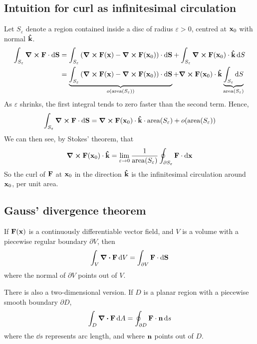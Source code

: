 \subsection{Intuition for curl as infinitesimal circulation}
Let \(S_\varepsilon\) denote a region contained inside a disc of radius \(\varepsilon > 0\), centred at \(\vb x_0\) with normal \(\vu{k}\).
\begin{align*}
	\int_{S_\varepsilon} \curl{\vb F} \cdot \dd{\vb S} & = \int_{S_\varepsilon} \left( \curl{\vb F(\vb x)} - \curl{\vb F(\vb x_0)} \right) \cdot \dd{\vb S} + \int_{S_\varepsilon} \curl{\vb F(\vb x_0)} \cdot \vu k \dd{S}                                                                                            \\
	                                                   & = \underbrace{\int_{S_\varepsilon} \left( \curl{\vb F(\vb x)} - \curl{\vb F(\vb x_0)} \right) \cdot \dd{\vb S}}_{o(\mathrm{area}(S_\varepsilon))} + \curl{\vb F(\vb x_0)} \cdot \vu k \underbrace{\int_{S_\varepsilon} \dd{S}}_{\mathrm{area}(S_\varepsilon)} \\
\end{align*}
As \(\varepsilon\) shrinks, the first integral tends to zero faster than the second term.
Hence,
\[
	\int_{S_\varepsilon} \curl{\vb F} \cdot \dd{\vb S} =  \curl{\vb F(\vb x_0)} \cdot \vu k \cdot \mathrm{area}(S_\varepsilon) + o(\mathrm{area}(S_\varepsilon))
\]
We can then see, by Stokes' theorem, that
\[
	\curl{\vb F(\vb x_0)} \cdot \vu k = \lim_{\varepsilon \to 0} \frac{1}{\mathrm{area}(S_\varepsilon)} \oint_{\partial S_\varepsilon} \vb F \cdot \dd{\vb x}
\]
So the curl of \(\vb F\) at \(\vb x_0\) in the direction \(\vu k\) is the infinitesimal circulation around \(\vb x_0\), per unit area.

\subsection{Gauss' divergence theorem}
\begin{proposition}
	If \(\vb F(\vb x)\) is a continuously differentiable vector field, and \(V\) is a volume with a piecewise regular boundary \(\partial V\), then
	\[
		\int_V \div{\vb F} \dd{V} = \int_{\partial V} \vb F \cdot \dd{\vb S}
	\]
	where the normal of \(\partial V\) points out of \(V\).
\end{proposition}
There is also a two-dimensional version.
If \(D\) is a planar region with a piecewise smooth boundary \(\partial D\),
\[
	\int_D \div{\vb F} \dd{A} = \oint_{\partial D} \vb F \cdot \vb n \dd{s}
\]
where the \(\dd{s}\) represents arc length, and where \(\vb n\) points out of \(D\).

